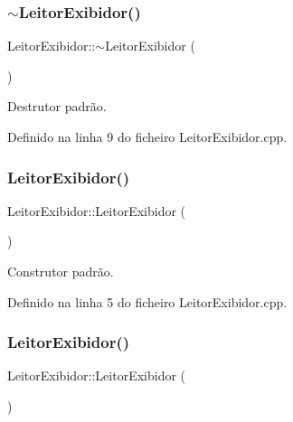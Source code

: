 \subsubsection{\texorpdfstring{$\sim$\+Leitor\+Exibidor()}{~LeitorExibidor()}}
{\footnotesize\ttfamily Leitor\+Exibidor\+::$\sim$\+Leitor\+Exibidor (\begin{DoxyParamCaption}{ }\end{DoxyParamCaption})}



Destrutor padrão. 



Definido na linha 9 do ficheiro Leitor\+Exibidor.\+cpp.

\mbox{\label{classLeitorExibidor_a246be764c0b6895539f915cc0f813e7b}} 
\subsubsection{\texorpdfstring{Leitor\+Exibidor()}{LeitorExibidor()}\hspace{0.1cm}{\footnotesize\ttfamily [1/2]}}
{\footnotesize\ttfamily Leitor\+Exibidor\+::\+Leitor\+Exibidor (\begin{DoxyParamCaption}{ }\end{DoxyParamCaption})\hspace{0.3cm}{\ttfamily [private]}}



Construtor padrão. 



Definido na linha 5 do ficheiro Leitor\+Exibidor.\+cpp.

\mbox{\label{classLeitorExibidor_a98a0f84f7d42d7868317cacfc883398d}} 
\subsubsection{\texorpdfstring{Leitor\+Exibidor()}{LeitorExibidor()}\hspace{0.1cm}{\footnotesize\ttfamily [2/2]}}
{\footnotesize\ttfamily Leitor\+Exibidor\+::\+Leitor\+Exibidor (\begin{DoxyParamCaption}\item[{\hyperlink{classLeitorExibidor}{Leitor\+Exibidor} const \&}]{ }\end{DoxyParamCaption})\hspace{0.3cm}{\ttfamily [private]}}



